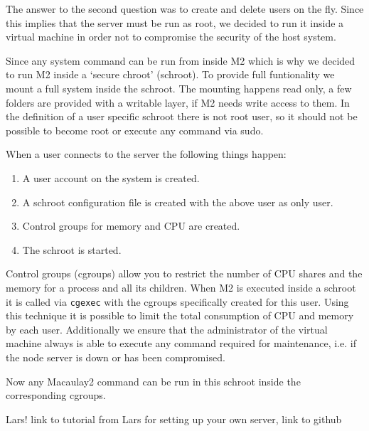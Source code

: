 \documentclass[]{article}
\begin{document}
The answer to the second question was to create and delete users on the fly. Since this implies that the server must be run as root, we decided to run it inside a virtual machine in order not to compromise the security of the host system.


Since any system command can be run from inside M2 which is why we decided to run M2 inside a `secure chroot' (schroot). To provide full funtionality we mount a full system inside the schroot. The mounting happens read only, a few folders are provided with a writable layer, if M2 needs write access to them. In the definition of a user specific schroot there is not root user, so it should not be possible to become root or execute any command via sudo.

When a user connects to the server the following things happen:
\begin{enumerate}
\item A user account on the system is created.
\item A schroot configuration file is created with the above user as only user.
\item Control groups for memory and CPU are created.
\item The schroot is started.
\end{enumerate}

Control groups (cgroups) allow you to restrict the number of CPU shares and the memory for a process and all its children. When M2 is executed inside a schroot it is called via {\tt cgexec} with the cgroups specifically created for this user. Using this technique it is possible to limit the total consumption of CPU and memory by each user. Additionally we ensure that the administrator of the virtual machine always is able to execute any command required for maintenance, i.e. if the node server is down or has been compromised.

Now any Macaulay2 command can be run in this schroot inside the corresponding cgroups.

Lars!
link to tutorial from Lars for setting up your own server, link to github





\end{document}
